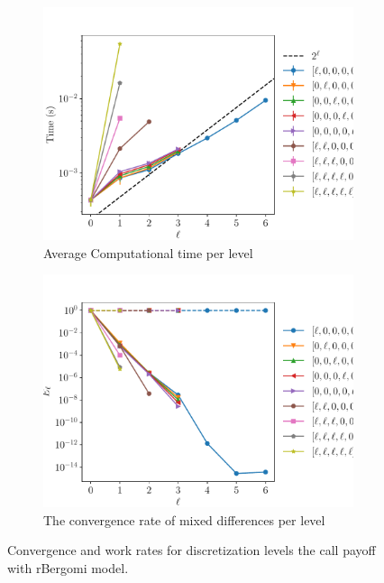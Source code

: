 \documentclass[11pt]{article}
\begin{document}
\begin{figure}[!h]
	\centering
	\begin{subfigure}{.5\textwidth}
		\centering
		\includegraphics[width=0.95\linewidth]{./figures/rbergomi_8_steps_K_e__4/level_work.pdf}
		\caption{Average Computational time per level}
		\label{fig:misc_rbergomi_8_steps_sub3}
	\end{subfigure}%
	\begin{subfigure}{.5\textwidth}
		\centering
		\includegraphics[width=0.95\linewidth]{./figures/rbergomi_8_steps_K_e__4/levels_error_rate.pdf}
		\caption{  The convergence rate of mixed differences per level}
		\label{fig:misc_rbergomi_8_steps_sub4}
	\end{subfigure}%
	\caption{Convergence and work rates for discretization levels  the call payoff with rBergomi model.}
	\label{fig:misc_rbergomi_8_steps_2}
\end{figure}
\end{document}
